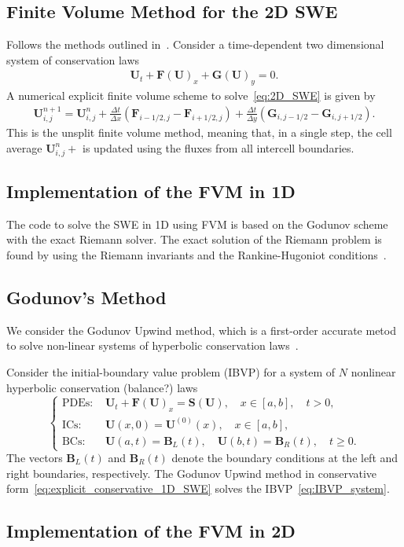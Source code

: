 \subsection{Finite Volume Method for the 2D SWE}
Follows the methods outlined in~\cite{Toro2009-Riemann}.
Consider a time-dependent two dimensional system of conservation laws
\begin{align}\label{eq:2D_SWE}
    \mathbf{U}_t + \mathbf{F(U)}_x + \mathbf{G(U)}_y = 0.
\end{align}
A numerical explicit finite volume scheme to solve~\eqref{eq:2D_SWE} is given by
\begin{align}
    \mathbf{U}_{i,j}^{n+1} = \mathbf{U}_{i,j}^n + \frac{\Delta t}{\Delta x}(\mathbf{F}_{i-1/2,j} - \mathbf{F}_{i+1/2,j}) + \frac{\Delta t}{\Delta y}(\mathbf{G}_{i,j-1/2} - \mathbf{G}_{i,j+1/2}).
\end{align}
This is the unsplit finite volume method, meaning that, in a single step, the cell average $\mathbf{U}_{i,j}^n+$ is updated using the fluxes from all intercell boundaries.


\subsection{Implementation of the FVM in 1D}
The code to solve the SWE in 1D using FVM is based on the Godunov scheme with the exact Riemann solver.
The exact solution of the Riemann problem is found by using the Riemann invariants and the Rankine-Hugoniot conditions~\cite{trento_course}.

\subsection{Godunov's Method}
We consider the Godunov Upwind method, which is a first-order accurate metod to solve non-linear systems of hyperbolic conservation laws~\cite{Toro2024}.

Consider the initial-boundary value problem (IBVP) for a system of $N$ nonlinear hyperbolic conservation (balance?) laws     
\begin{equation}\label{eq:IBVP_system}
    \begin{cases}
    \text{PDEs: }    &\mathbf{U}_t + \mathbf{F(U)}_x = \mathbf{S(U)}, \quad x \in [a, b], \quad t > 0, \\
    \text{ICs: }    &\mathbf{U}(x,0) = \mathbf{U}^{(0)}(x), \quad x \in [a,b], \\
    \text{BCs: }    &\mathbf{U}(a,t) = \mathbf{B}_{L}(t), \quad \mathbf{U}(b,t) = \mathbf{B}_{R}(t), \quad t \geq 0.
    \end{cases}
\end{equation}
The vectors $\mathbf{B}_L (t)$ and $\mathbf{B}_R (t)$ denote the boundary conditions at the left and right boundaries, respectively.
The Godunov Upwind method in conservative form~\eqref{eq:explicit_conservative_1D_SWE} solves the IBVP~\eqref{eq:IBVP_system}.


\subsection{Implementation of the FVM in 2D}






